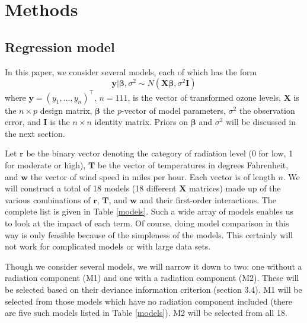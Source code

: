 \documentclass{asaproc}
\newcommand{\m}[1]{\mathbf{\bm{#1}}}
\begin{document}
\section{Methods}

\subsection{Regression model}

In this paper, we consider several models, each of which has the form
\[ \m{y}|\m{\beta},\sigma^2 \sim N\left(\m{X}\m{\beta}, \sigma^2\m{I}\right) \]
where $\m{y}=(y_1,\ldots,y_n)^\top$, $n=111$, is the vector of transformed ozone levels, $\m{X}$ is the $n\times p$ design matrix, $\m{\beta}$ the $p$-vector of model parameters, $\sigma^2$ the observation error, and $\m{I}$ is the $n\times n$ identity matrix. Priors on $\m{\beta}$ and $\sigma^2$ will be discussed in the next section.

Let $\m{r}$ be the binary vector denoting the category of radiation level (0 for low, 1 for moderate or high), $\m{T}$ be the vector of temperatures in degrees Fahrenheit, and $\m{w}$ the vector of wind speed in miles per hour. Each vector is of length $n$. We will construct a total of 18 models (18 different $\m{X}$ matrices) made up of the various combinations of $\m{r}$, $\m{T}$, and $\m{w}$ and their first-order interactions. The complete list is given in Table \ref{models}. Such a wide array of models enables us to look at the impact of each term. Of course, doing model comparison in this way is only feasible because of the simpleness of the models. This certainly will not work for complicated models or with large data sets.

Though we consider several models, we will narrow it down to two: one without a radiation component (M1) and one with a radiation component (M2). These will be selected based on their deviance information criterion (section 3.4). M1 will be selected from those models which have no radiation component included (there are five such models listed in Table \ref{models}). M2 will be selected from all 18.
\end{document}
